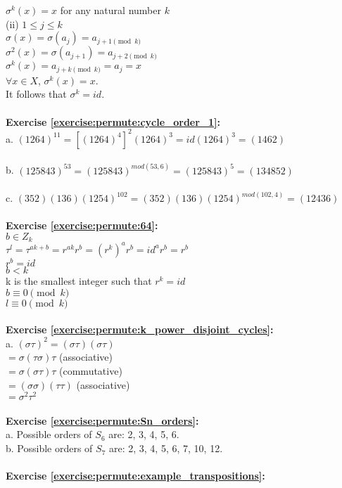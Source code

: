 $\sigma^k(x)=x$ for any natural number $k$\\
(ii) $1\le j\le k$\\
$\sigma(x)=\sigma(a_j)=a_{j+1\pmod{k}}$\\
$\sigma^2(x)=\sigma(a_{j+1})=a_{j+2\pmod{k}}$\\
$\sigma^k(x)=a_{j+k\pmod{k}}=a_j=x$\\
$\forall x\in X$, $\sigma^k(x)=x$.\\
It follows that $\sigma^k=id$.\\
\\
\textbf{Exercise \ref{exercise:permute:cycle_order_1}:}\\
a. $(1264)^{11}=[(1264)^4]^2(1264)^3=id(1264)^3=(1462)$\\
\\
b. $(125843)^{53}=(125843)^{mod(53,6)}=(125843)^5=(134852)$\\
\\
c. $(352)(136)(1254)^{102}=(352)(136)(1254)^{mod(102,4)}=(12436)$\\
\\
\textbf{Exercise \ref{exercise:permute:64}:}\\
$b\in Z_k$\\
$\tau^l=\tau^{ak+b}=r^{ak}r^b=(r^k)^ar^b=id^ar^b=r^b$\\
$r^b=id$\\
$b<k$\\
k is the smallest integer such that $r^k=id$\\
$b\equiv 0\pmod{k}$\\
$l\equiv 0\pmod{k}$\\
\\
\textbf{Exercise \ref{exercise:permute:k_power_disjoint_cycles}:}\\
a. $(\sigma\tau)^2=(\sigma\tau)(\sigma\tau)$\\
$=\sigma(\tau\sigma)\tau$ (associative)\\
$=\sigma(\sigma\tau)\tau$ (commutative)\\
$=(\sigma\sigma)(\tau\tau)$ (associative)\\
$=\sigma^2\tau^2$\\
\\
\textbf{Exercise \ref{exercise:permute:Sn_orders}:}\\
a. Possible orders of $S_6$ are: 2, 3, 4, 5, 6.\\
b. Possible orders of $S_7$ are: 2, 3, 4, 5, 6, 7, 10, 12.\\
\\
\textbf{Exercise \ref{exercise:permute:example_transpositions}:}\\
